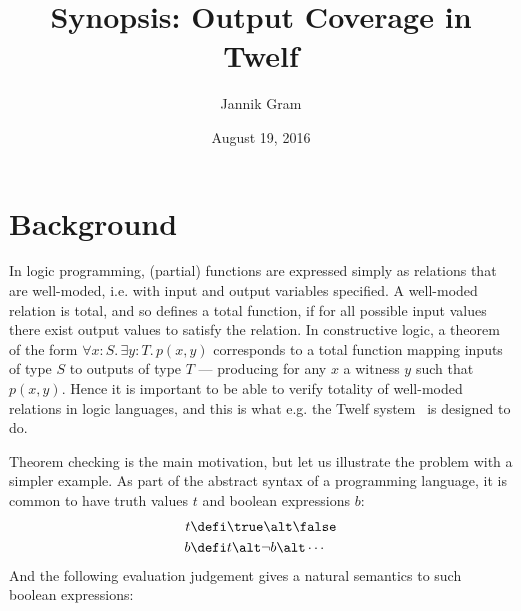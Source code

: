 \documentclass[12pt]{article}
\begin{document}
\title{Synopsis: Output Coverage in Twelf}
\author{Jannik Gram}
\date{August 19, 2016}

\maketitle

\section*{Background}

In logic programming, (partial) functions are expressed simply as relations that are well-moded, i.e. with input and output variables specified.
A well-moded relation is total, and so defines a total function, if for all possible input values there exist output values to satisfy the relation.
In constructive logic, a theorem of the form $\forall x{:}S . \, \exists y{:}T . \, p(x, y)$ corresponds to a total function mapping inputs of type $S$ to outputs of type $T$ --- producing for any $x$ a witness $y$ such that $p(x, y)$.
Hence it is important to be able to verify totality of well-moded relations in logic languages, and this is what e.g. the Twelf system~\cite{PfenningSchurmann99} is designed to do.

Theorem checking is the main motivation, but let us illustrate the problem with a simpler example.
As part of the abstract syntax of a programming language, it is common to have truth values $t$ and boolean expressions $b$:
\begin{align*}
  t &\defi \true \alt \false \\
  b &\defi t \alt \neg{b} \alt \cdots
\end{align*}
And the following evaluation judgement gives a natural semantics to such boolean expressions:

{ %
\vspace{0.5cm}
\noindent {}

\begin{prooftree}
\end{prooftree}

\begin{prooftree}
\end{prooftree}

\begin{prooftree}
\end{prooftree}

\centering{$\vdots$}

\vspace{0.5cm}
}
\end{document}
